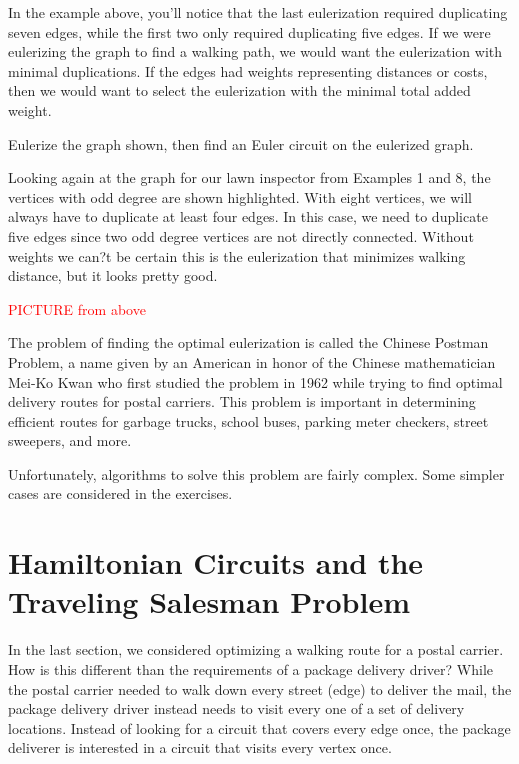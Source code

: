 In the example above, you'll notice that the last eulerization required duplicating seven edges, while the first two only required duplicating five edges.  If we were eulerizing the graph to find a walking path, we would want the eulerization with minimal duplications.  If the edges had weights representing distances or costs, then we would want to select the eulerization with the minimal total added weight.


\begin{exercise}{}{} %
Eulerize the graph shown, then find an Euler circuit on the eulerized graph.\\
\end{exercise}


\begin{example}{}{}%
Looking again at the graph for our lawn inspector from Examples 1 and 8, the vertices with odd degree are shown highlighted.  With eight vertices, we will always have to duplicate at least four edges.  In this case, we need to duplicate five edges since two odd degree vertices are not directly connected.  Without weights we can?t be certain this is the eulerization that minimizes walking distance, but it looks pretty good.

\textcolor{red}{PICTURE from above}
\end{example}


The problem of finding the optimal eulerization is called the Chinese Postman Problem, a name given by an American in honor of the Chinese mathematician Mei-Ko Kwan who first studied the problem in 1962 while trying to find optimal delivery routes for postal carriers.   This problem is important in determining efficient routes for garbage trucks, school buses, parking meter checkers, street sweepers, and more.

Unfortunately, algorithms to solve this problem are fairly complex.  Some simpler cases are considered in the exercises.


\section{Hamiltonian Circuits and the Traveling Salesman Problem}
In the last section, we considered optimizing a walking route for a postal carrier.  How is this different than the requirements of a package delivery driver?  While the postal carrier needed to walk down every street (edge) to deliver the mail, the package delivery driver instead needs to visit every one of a set of delivery locations.  Instead of looking for a circuit that covers every edge once, the package deliverer is interested in a circuit that visits every vertex once.


